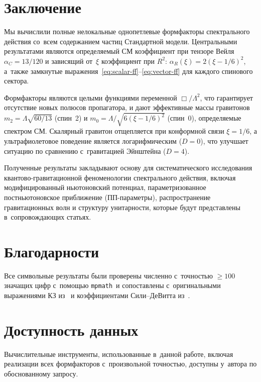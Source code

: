 \documentclass[12pt,a4paper]{article}
\begin{document}
\section{Заключение}
\label{sec:conclusions}

Мы вычислили полные нелокальные однопетлевые формфакторы спектрального действия
со~всем содержанием частиц Стандартной модели. Центральными результатами
являются определяемый СМ коэффициент при тензоре Вейля $\alpha_C = 13/120$ и
зависящий от~$\xi$ коэффициент при $R^2$:
$\alpha_R(\xi) = 2(\xi - 1/6)^2$, а~также замкнутые
выражения~\eqref{eq:scalar-ff}--\eqref{eq:vector-ff}
для каждого спинового сектора.

Формфакторы являются целыми функциями переменной $\Box/\Lambda^2$, что
гарантирует отсутствие новых полюсов пропагатора, и дают эффективные массы
гравитонов $m_2 = \Lambda\sqrt{60/13}$ (спин~2) и
$m_0 = \Lambda/\sqrt{6(\xi-1/6)^2}$ (спин~0), определяемые спектром СМ.
Скалярный гравитон отщепляется при конформной связи $\xi = 1/6$, а
ультрафиолетовое поведение является логарифмическим ($D = 0$), что улучшает
ситуацию по сравнению с~гравитацией Эйнштейна ($D = 4$).

Полученные результаты закладывают основу для систематического исследования
квантово-гравитационной феноменологии спектрального действия, включая
модифицированный ньютоновский потенциал, параметризованное
постньютоновское приближение (ПП-параметры), распространение гравитационных волн
и структуру унитарности, которые будут представлены в~сопровождающих статьях.


\section*{Благодарности}
Все символьные результаты были проверены численно с~точностью
$\geq 100$ значащих цифр с~помощью \texttt{mpmath}~и сопоставлены
с~оригинальными выражениями КЗ из~\cite{Codello:2012kq} и коэффициентами
Сили--ДеВитта из~\cite{Vassilevich:2003xt,Avramidi:2000bm}.

\section*{Доступность данных}
Вычислительные инструменты, использованные в~данной работе, включая реализации
всех формфакторов с~произвольной точностью, доступны у~автора по обоснованному
запросу.
\end{document}
